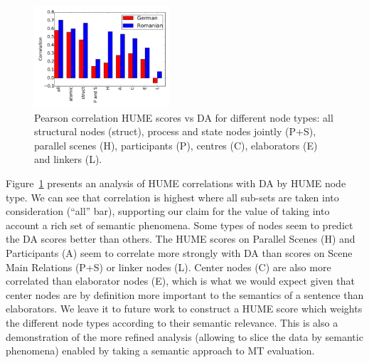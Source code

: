 \documentclass[11pt,letterpaper]{article}
\newcommand{\oa}[1]{}
\begin{document}
\begin{figure}[t]
\includegraphics[width=0.45\textwidth]{humevsDAcorrtypes-10en-dero.pdf}
\caption{Pearson correlation HUME scores vs DA for different node types: all
structural nodes (struct), process and state nodes jointly (P+S), parallel
scenes (H), participants (P), centres (C), elaborators (E) and linkers
(L).}
\label{fig:dacorrelationtypes}
\end{figure}

Figure~\ref{fig:dacorrelationtypes} presents an analysis of HUME correlations with DA by HUME node type. We can see that correlation is highest where all sub-sets are taken into consideration (``all'' bar), supporting our claim for the value of taking into account a rich set of semantic phenomena. Some types of nodes seem to predict the DA scores better than others. The HUME scores on Parallel Scenes (H) and Participants (A) seem to correlate more strongly with DA than scores on Scene Main Relations (P+S) or linker nodes (L). Center nodes (C) are also more correlated than elaborator nodes (E), which is what we would expect given that center nodes are by definition more important to the semantics of a sentence than elaborators. We leave it to future work to construct a HUME score which weights the different node types according to their semantic relevance.\oa{I think we should be careful here. It may very well be that these stem from the number of nodes taken into account. I think we should also say explicitly that .}
This is also a demonstration of the more refined analysis (allowing to slice the data by semantic phenomena) enabled by taking a semantic approach to MT evaluation.



\end{document}
